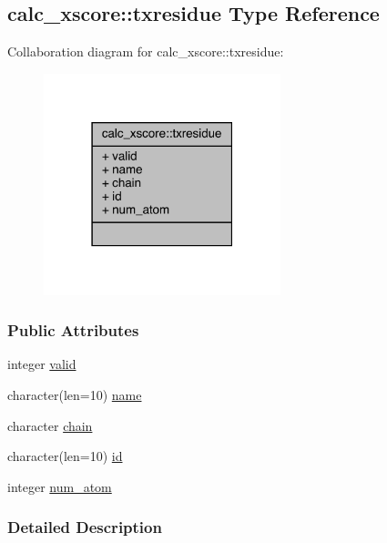 \hypertarget{structcalc__xscore_1_1txresidue}{\subsection{calc\-\_\-xscore\-:\-:txresidue Type Reference}
\label{structcalc__xscore_1_1txresidue}
}


Collaboration diagram for calc\-\_\-xscore\-:\-:txresidue\-:
\nopagebreak
\begin{figure}[H]
\begin{center}
\leavevmode
\includegraphics[width=195pt]{structcalc__xscore_1_1txresidue__coll__graph}
\end{center}
\end{figure}
\subsubsection*{Public Attributes}
\begin{DoxyCompactItemize}
\item 
integer \hyperlink{structcalc__xscore_1_1txresidue_aaf75d81d84cd19e15eaa89ea686e52db}{valid}
\item 
character(len=10) \hyperlink{structcalc__xscore_1_1txresidue_af9896b6a04f8e86fb6fb94caeed5ed11}{name}
\item 
character \hyperlink{structcalc__xscore_1_1txresidue_a676078b072025e9bbe755714dc2f601c}{chain}
\item 
character(len=10) \hyperlink{structcalc__xscore_1_1txresidue_adfa1be9bb7a0b7305d1cfcb4f323be9a}{id}
\item 
integer \hyperlink{structcalc__xscore_1_1txresidue_a5eacf73d1159dfb7e30248b76329f062}{num\-\_\-atom}
\end{DoxyCompactItemize}


\subsubsection{Detailed Description}


